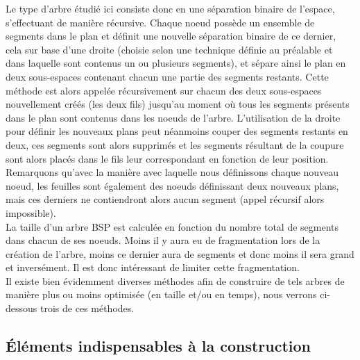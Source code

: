 \documentclass[11pt,a4paper]{article}
\begin{document}
Le type d'arbre étudié ici consiste donc en une séparation binaire de l'espace, s'effectuant de manière récursive. Chaque noeud possède un ensemble de segments dans le plan et définit une nouvelle séparation binaire de ce dernier, cela sur base d'une droite (choisie selon une technique définie au préalable et dans laquelle sont contenus un ou plusieurs segments), et sépare ainsi le plan en deux sous-espaces contenant chacun une partie des segments restants. Cette méthode est alors appelée récursivement sur chacun des deux sous-espaces nouvellement créés (les deux fils) jusqu'au moment où tous les segments présents dans le plan sont contenus dans les noeuds de l'arbre. L'utilisation de la droite pour définir les nouveaux plans peut néanmoins couper des segments restants en deux, ces segments sont alors supprimés et les segments résultant de la coupure sont alors placés dans le fils leur correspondant en fonction de leur position. Remarquons qu'avec la manière avec laquelle nous définissons chaque nouveau noeud, les feuilles sont également des noeuds définissant deux nouveaux plans, mais ces derniers ne contiendront alors aucun segment (appel récursif alors impossible). \\

La taille d'un arbre BSP est calculée en fonction du nombre total de segments dans chacun de ses noeuds. Moins il y aura eu de fragmentation lors de la création de l'arbre, moins ce dernier aura de segments et donc moins il sera grand et inversément. Il est donc intéressant de limiter cette fragmentation. \\

Il existe bien évidemment diverses méthodes afin de construire de tels arbres de manière plus ou moins optimisée (en taille et/ou en temps), nous verrons ci-dessous trois de ces méthodes. 

\subsection{Éléments indispensables à la construction}
\end{document}

